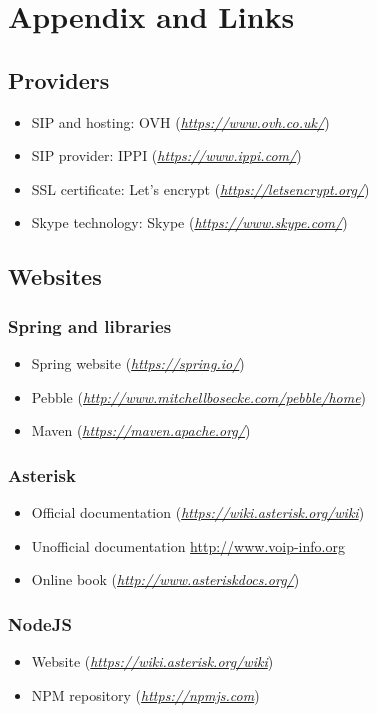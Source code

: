 \chapter{Appendix and Links}

\section{Providers}
\begin{itemize}  
\item SIP and hosting:  OVH (\textit{\url{https://www.ovh.co.uk/}})
\item SIP provider:     IPPI (\textit{\url{https://www.ippi.com/}})
\item SSL certificate:  Let's encrypt (\textit{\url{https://letsencrypt.org/}})
\item Skype technology: Skype (\textit{\url{https://www.skype.com/}})
\end{itemize}

\section{Websites}

\subsection{Spring and libraries}
\begin{itemize}
\item Spring website (\textit{\url{https://spring.io/}})
\item Pebble (\textit{\url{http://www.mitchellbosecke.com/pebble/home}})
\item Maven (\textit{\url{https://maven.apache.org/}})
\end{itemize}

\subsection{Asterisk}
\begin{itemize}
\item Official documentation (\textit{\url{https://wiki.asterisk.org/wiki}})
\item Unofficial documentation \url{http://www.voip-info.org}
\item Online book (\textit{\url{http://www.asteriskdocs.org/}})
\end{itemize}

\subsection{NodeJS}
\begin{itemize}
\item Website (\textit{\url{https://wiki.asterisk.org/wiki}})
\item NPM repository (\textit{\url{https://npmjs.com}})
\end{itemize}